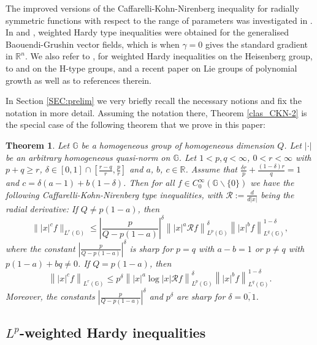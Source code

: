 \documentclass[a4paper,12pt,reqno]{amsart}
\numberwithin{equation}{section}
\theoremstyle{plain}
\newtheorem{thm}{Theorem}[section]
\theoremstyle{definition}
\newcommand{\Rn}{\mathbb R^{n}}
\begin{document}
The improved versions of the Caffarelli-Kohn-Nirenberg inequality for radially symmetric functions with respect to the range of parameters was investigated in \cite{NDD12}. In \cite{ZhHD15} and \cite{HZh11}, weighted Hardy type inequalities were obtained for the generalised Baouendi-Grushin vector fields, which is when $\gamma=0$ gives the standard gradient in $\Rn$. We also refer to \cite{HNZh11}, \cite{Han15} for weighted Hardy inequalities on the Heisenberg group, to \cite{HZhD11} and \cite{ZhHD14} on the H-type groups, and a recent paper \cite{Yacoub17} on Lie groups of polynomial growth as well as to references therein.

In Section \ref{SEC:prelim} we very briefly recall the necessary notions and fix the notation in more detail. Assuming the notation there, Theorem \ref{clas_CKN-2} is the special case of the following theorem that we prove in this paper:

\begin{thm}\label{THM:CKN-i}
Let $\mathbb{G}$ be a homogeneous group
of homogeneous dimension $Q$. Let $|\cdot|$ be an arbitrary homogeneous quasi-norm on $\mathbb{G}$. Let $1<p,q<\infty$, $0<r<\infty$ with $p+q\geq r$, $\delta\in[0,1]\cap\left[\frac{r-q}{r},\frac{p}{r}\right]$ and $a$, $b$, $c\in\mathbb{R}$. Assume that $\frac{\delta r}{p}+\frac{(1-\delta)r}{q}=1$ and $c=\delta(a-1)+b(1-\delta)$. Then
for all $f\in C_{0}^{\infty}(\mathbb{G}\backslash\{0\})$ we have the following Caffarelli-Kohn-Nirenberg type inequalities, with $\mathcal{R}:=\frac{d}{d|x|}$ being the radial derivative:
If $Q\neq p(1-a)$, then
$$
\||x|^{c}f\|_{L^{r}(\mathbb{G})}
\leq \left|\frac{p}{Q-p(1-a)}\right|^{\delta} \left\||x|^{a}\mathcal{R}f\right\|^{\delta}_{L^{p}(\mathbb{G})}
\left\||x|^{b}f\right\|^{1-\delta}_{L^{q}(\mathbb{G})},
$$
where the constant $\left|\frac{p}{Q-p(1-a)}\right|^{\delta}$ is sharp for $p=q$ with $a-b=1$ or $p\neq q$ with $p(1-a)+bq\neq0$.
If $Q=p(1-a)$, then
$$
\left\||x|^{c}f\right\|_{L^{r}(\mathbb{G})}
\leq p^{\delta} \left\||x|^{a}\log|x|\mathcal{R}f\right\|^{\delta}_{L^{p}(\mathbb{G})}
\left\||x|^{b}f\right\|^{1-\delta}_{L^{q}(\mathbb{G})}.
$$ Moreover, the constants $\left|\frac{p}{Q-p(1-a)}\right|^{\delta}$ and $p^{\delta}$ are sharp for $\delta=\overline{0,1}$.
\end{thm}


\subsection{$L^{p}$-weighted Hardy inequalities}
\end{document}
